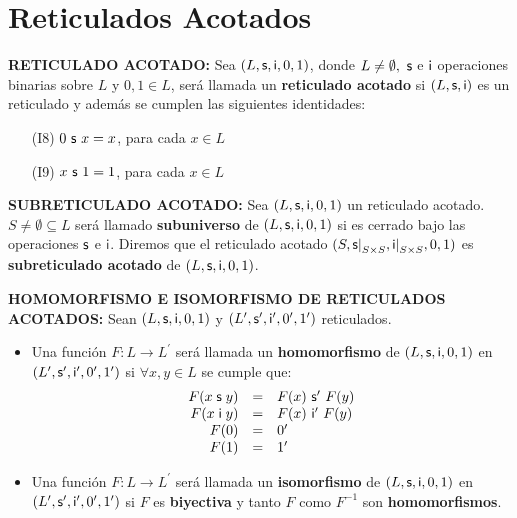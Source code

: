\section{Reticulados Acotados}

  \PN \textbf{RETICULADO ACOTADO:} Sea $(L, \mathsf{s}, \mathsf{i}, 0, 1)$, donde $L \neq \emptyset, \ \mathsf{s}$ e $\mathsf{i}$ operaciones
  binarias sobre $L$ y $0, 1 \in L$, será llamada un \textbf{reticulado acotado} si $(L, \mathsf{s}, \mathsf{i})$ es un reticulado y
  además se cumplen las siguientes identidades:
  \begin{enumerate}
    \item[(I8)] $0 \ \mathsf{s} \ x = x$, para cada $x \in L$
    \item[(I9)] $x \ \mathsf{s} \ 1 = 1$, para cada $x \in L$
  \end{enumerate}

  \vspace{3mm}
  \PN \textbf{SUBRETICULADO ACOTADO:} Sea $(L, \mathsf{s}, \mathsf{i}, 0, 1)$ un reticulado acotado. $S \neq \emptyset \subseteq L$
  será llamado \textbf{subuniverso} de $(L, \mathsf{s}, \mathsf{i}, 0, 1)$ si es cerrado bajo las operaciones $\mathsf{s}$ e $\mathsf{i}$. Diremos
  que el reticulado acotado $(S, \mathsf{s}\mathrm{\mid}_{S \times S}, \mathsf{i}\mathrm{\mid}_{S \times S}, 0, 1)$ es
  \textbf{subreticulado acotado} de $(L, \mathsf{s}, \mathsf{i}, 0, 1)$.

  \vspace{3mm}
  \PN \textbf{HOMOMORFISMO E ISOMORFISMO DE RETICULADOS ACOTADOS:} Sean $(L, \mathsf{s}, \mathsf{i}, 0, 1)$ y
  $(L^{\prime}, \mathsf{s}^{\prime}, \mathsf{i}^{\prime}, 0^{\prime}, 1^{\prime})$ reticulados.
  \begin{itemize}
    \item Una función $F: L \rightarrow L^{\prime}$ será llamada un \textbf{homomorfismo} de $(L, \mathsf{s}, \mathsf{i}, 0, 1)$ en
      $(L^{\prime}, \mathsf{s}^{\prime}, \mathsf{i}^{\prime}, 0^{\prime}, 1^{\prime})$ si $\forall x, y \in L$ se cumple que:
      \[
        \begin{array}{rcl}
          F(x \mathsf{\;s\;} y) &=& F(x) \ \mathsf{s}^{\prime} \ F(y) \\
          F(x \mathsf{\;i\;} y) &=& F(x) \ \mathsf{i}^{\prime} \ F(y) \\
          F(0) &=& 0^{\prime} \\
          F(1) &=& 1^{\prime}
        \end{array}
      \]
    \item Una función $F: L \rightarrow L^{\prime}$ será llamada un \textbf{isomorfismo} de $(L, \mathsf{s}, \mathsf{i}, 0, 1)$ en
      $(L^{\prime}, \mathsf{s}^{\prime}, \mathsf{i}^{\prime}, 0^{\prime}, 1^{\prime})$ si $F$ es \textbf{biyectiva} y tanto $F$ como
      $F^{-1}$ son \textbf{homomorfismos}.
  \end{itemize}

